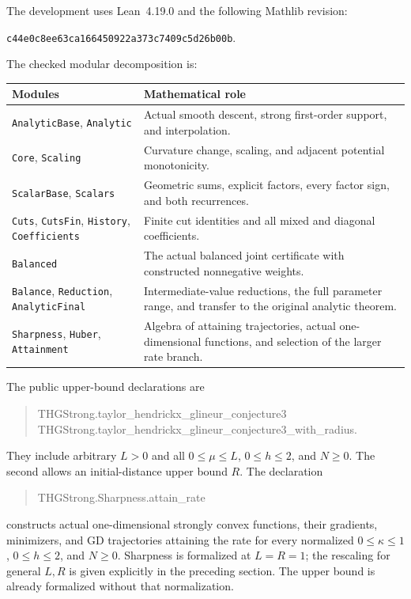 \documentclass[11pt]{article}
\numberwithin{equation}{section}
\theoremstyle{remark}
\begin{document}
The development uses Lean~4.19.0 and the following Mathlib revision:
\begin{center}
\texttt{c44e0c8ee63ca166450922a373c7409c5d26b00b}.
\end{center}
The checked modular decomposition is:
\begin{center}
\begin{tabular}{>{\raggedright\arraybackslash}p{}>{\raggedright\arraybackslash}p{}}
\toprule
Modules & Mathematical role\\
\midrule
\texttt{AnalyticBase}, \texttt{Analytic} &
Actual smooth descent, strong first-order support, and interpolation.\\[3pt]
\texttt{Core}, \texttt{Scaling} &
Curvature change, scaling, and adjacent potential monotonicity.\\[3pt]
\texttt{ScalarBase}, \texttt{Scalars} &
Geometric sums, explicit factors, every factor sign, and both recurrences.\\[3pt]
\texttt{Cuts}, \texttt{CutsFin}, \texttt{History}, \texttt{Coefficients} &
Finite cut identities and all mixed and diagonal coefficients.\\[3pt]
\texttt{Balanced} &
The actual balanced joint certificate with constructed nonnegative weights.\\[3pt]
\texttt{Balance}, \texttt{Reduction}, \texttt{AnalyticFinal} &
Intermediate-value reductions, the full parameter range, and transfer
to the original analytic theorem.\\[3pt]
\texttt{Sharpness}, \texttt{Huber}, \texttt{Attainment} &
Algebra of attaining trajectories, actual one-dimensional functions,
and selection of the larger rate branch.\\
\bottomrule
\end{tabular}
\end{center}

The public upper-bound declarations are
\begin{quote}\small\ttfamily
THGStrong.taylor\_hendrickx\_glineur\_conjecture3\\
THGStrong.taylor\_hendrickx\_glineur\_conjecture3\_with\_radius.
\end{quote}
They include arbitrary $L>0$ and all $0\leq\mu\leq L$, $0\leq h\leq2$,
and $N\geq0$. The second allows an initial-distance upper bound $R$.
The declaration
\begin{quote}\small\ttfamily
THGStrong.Sharpness.attain\_rate
\end{quote}
constructs actual one-dimensional strongly convex functions, their
gradients, minimizers, and GD trajectories attaining the rate for every
normalized $0\leq\kappa\leq1$, $0\leq h\leq2$, and $N\geq0$.
Sharpness is formalized at $L=R=1$; the rescaling for general $L,R$
is given explicitly in the preceding section. The upper bound is
already formalized without that normalization.
\end{document}
